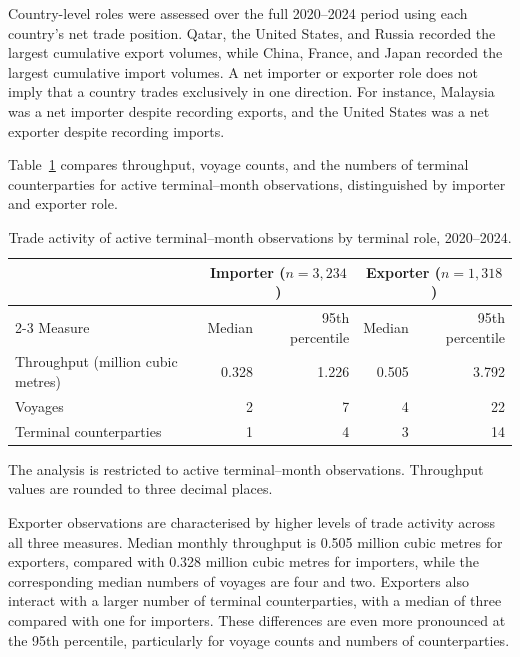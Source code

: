 \documentclass[pdftex,12pt,openright,a4paper,oneside]{book}
\begin{document}
Country-level roles were assessed over the full 2020--2024 period using each country's net trade position. 
Qatar, the United States, and Russia recorded the largest cumulative export volumes, while China, France, and Japan recorded the largest cumulative import volumes. 
A net importer or exporter role does not imply that a country trades exclusively in one direction. For instance, Malaysia was a net importer despite recording exports, and the United States was a net exporter despite recording imports.

Table~\ref{tab:eda_terminal_activity_by_role} compares throughput, voyage counts, and the numbers of terminal counterparties for active terminal--month observations, distinguished by importer and exporter role.

\begin{table}[htbp]
    \centering
    \caption{Trade activity of active terminal--month observations by terminal role, 2020--2024.}
    \label{tab:eda_terminal_activity_by_role}
    \begin{tabular}{lrrrr}
        \hline
        & \multicolumn{2}{c}{Importer ($n=3{,}234$)}
        & \multicolumn{2}{c}{Exporter ($n=1{,}318$)} \\
        \cline{2-3} \cline{4-5}
        Measure & Median & 95th percentile & Median & 95th percentile \\
        \hline
        Throughput (million cubic metres) & 0.328 & 1.226 & 0.505 & 3.792 \\
        Voyages & 2 & 7 & 4 & 22 \\
        Terminal counterparties & 1 & 4 & 3 & 14 \\
        \hline
    \end{tabular}
    \begin{flushleft}
        \footnotesize The analysis is restricted to active terminal--month observations.
        Throughput values are rounded to three decimal places.
    \end{flushleft}
\end{table}

Exporter observations are characterised by higher levels of trade activity across all three measures. 
Median monthly throughput is 0.505 million cubic metres for exporters, compared with 0.328 million cubic metres for importers, while the corresponding median numbers of voyages are four and two. 
Exporters also interact with a larger number of terminal counterparties, with a median of three compared with one for importers. 
These differences are even more pronounced at the 95th percentile, particularly for voyage counts and numbers of counterparties.
\end{document}
